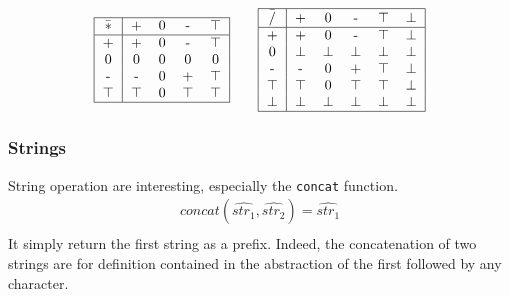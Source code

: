 \begin{align*}
\begin{tabular}{ | c | *{4}{c}|}
  \hline                       
  $\bar{*}$ & + & 0 & - & $\top$ \\
  \hline
   + & + & 0 & - & $\top$\\
   0 & 0 & 0 & 0 & 0\\
   - & - & 0 & + & $\top$\\
   $\top$ & $\top$ & 0 & $\top$ & $\top$\\
  \hline  
\end{tabular}
\qquad 
\begin{tabular}{ | c | *{5}{c}|}
  \hline                       
  $\bar{/}$ & + & 0 & - & $\top$ & $\bot$\\
  \hline
   + & + & 0 & - & $\top$ & $\bot$ \\
   0 & $\bot$ & $\bot$ & $\bot$ & $\bot$ & $\bot$ \\
   - & - & 0 & + & $\top$ & $\bot$ \\
   $\top$ & $\top$ & 0 & $\top$ & $\top$ & $\bot$ \\
   $\bot$ & $\bot$ & $\bot$ & $\bot$ & $\bot$ & $\bot$ \\
  \hline  
\end{tabular}
\end{align*}

\subsubsection{Strings}
String operation are interesting, especially the \texttt{concat} function.
\begin{align*}
concat(\widehat{str_1}, \widehat{str_2}) = \widehat{str_1}\\
\end{align*}
It simply return the first string as a prefix. Indeed, the concatenation of two strings are for definition contained in the abstraction of the first followed by any character.

